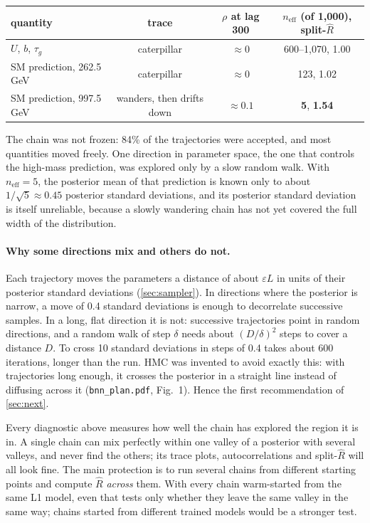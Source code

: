 \documentclass[11pt]{article}
\newcommand{\file}[1]{\nolinkurl{#1}}
\begin{document}
\begin{keyidea}
\begin{center}
\small
\begin{tabular}{lccc}
\toprule
quantity & trace & $\rho$ at lag 300 & $n_\text{eff}$ (of 1,000), split-$\hat R$\\
\midrule
$U$, $b$, $\tau_g$ & caterpillar & $\approx 0$ & 600--1,070, 1.00\\
SM prediction, 262.5 GeV & caterpillar & $\approx 0$ & 123, 1.02\\
SM prediction, 997.5 GeV & wanders, then drifts down & $\approx 0.1$ & \textbf{5}, \textbf{1.54}\\
\bottomrule
\end{tabular}
\end{center}
The chain was not frozen: 84\% of the trajectories were accepted, and most quantities
moved freely. One direction in parameter space, the one that controls the high-mass
prediction, was explored only by a slow random walk. With $n_\text{eff} = 5$, the
posterior mean of that prediction is known only to about $1/\sqrt{5} \approx 0.45$
posterior standard deviations, and its posterior standard deviation is itself unreliable,
because a slowly wandering chain has not yet covered the full width of the distribution.
\end{keyidea}

\paragraph{Why some directions mix and others do not.} Each trajectory moves the
parameters a distance of about $\varepsilon L$ in units of their posterior standard
deviations (\cref{sec:sampler}). In directions where the posterior is narrow, a move of
0.4 standard deviations is enough to decorrelate successive samples. In a long, flat
direction it is not: successive trajectories point in random directions, and a random walk
of step $\delta$ needs about $(D/\delta)^2$ steps to cover a distance $D$. To cross
10 standard deviations in steps of 0.4 takes about 600 iterations, longer than the run.
HMC was invented to avoid exactly this: with trajectories long enough, it crosses the
posterior in a straight line instead of diffusing across it (\file{bnn_plan.pdf},
Fig.~1). Hence the first recommendation of \cref{sec:next}.

\begin{watch}
Every diagnostic above measures how well the chain has explored the region it is in.
A single chain can mix perfectly within one valley of a posterior with several valleys,
and never find the others; its trace plots, autocorrelations and split-$\hat R$ will all
look fine. The main protection is to run several chains from different starting points
and compute $\hat R$ \emph{across} them. With every chain warm-started from the same
L1 model, even that tests only whether they leave the same valley in the same way;
chains started from different trained models would be a stronger test.
\end{watch}
\end{document}
